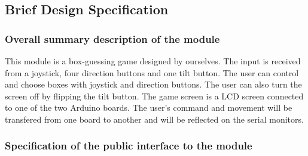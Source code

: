 \subsection{Brief Design Specification}
\subsubsection{Overall summary description of the module}
This module is a box-guessing game designed by ourselves. The input is received from a joystick, four direction buttons and one tilt button. The user can control and choose boxes with joystick and direction buttons. The user can also turn the screen off by flipping the tilt button. The game screen is a LCD screen connected to one of the two Arduino boards. The user's command and movement will be transfered from one board to another and will be reflected on the serial monitors.

\subsubsection{Specification of the public interface to the module}
